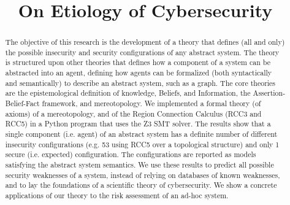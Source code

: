 \documentclass[conference]{IEEEtran}
\begin{document}
\title{On Etiology of Cybersecurity}

\author{
\and
{}
}

\maketitle

\begin{abstract}
The objective of this research is the development of a theory that defines (all
	and only) the possible insecurity and security configurations of any
	abstract system. The theory is structured upon other theories that
	defines how a component of a system can be abstracted into an agent,
	defining how agents can be formalized (both syntactically and
	semantically) to describe an abstract system, such as a graph. The core
	theories are the epistemological definition of knowledge, Beliefs, and
	Information, the Assertion-Belief-Fact framework, and mereotopology.
	We implemented a formal theory (of axioms) of a mereotopology, and of
	the Region Connection Calculus (RCC3 and RCC5) in a Python program that
	uses the Z3 SMT solver. The results show that a single component (i.e.
	agent) of an abstract system has a definite number of  different
	insecurity configurations (e.g. 53 using RCC5 over a topological
	structure) and only 1 secure (i.e.  expected) configuration. The
	configurations are reported as models satisfying the abstract system
	semantics. We use these results to predict all possible security
	weaknesses of a system, instead of relying on databases of known
	weaknesses, and to lay the foundations of a scientific theory of
	cybersecurity.  We show a concrete applications of our theory to the
	risk assessment of an ad-hoc system.
\end{abstract}

\IEEEpeerreviewmaketitle
\end{document}
